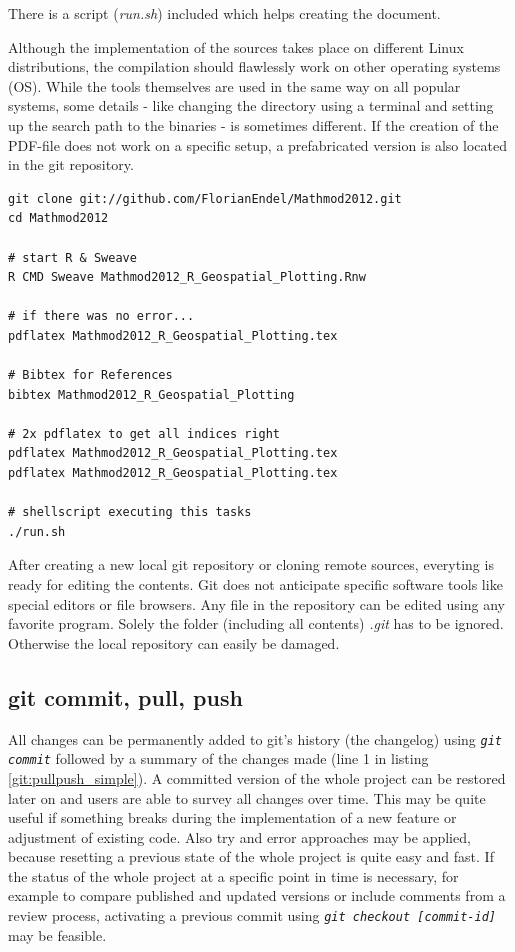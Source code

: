 \documentclass{ifacconf}
\begin{document}
There is a script (\textit{run.sh}) included which helps creating the document.

Although the implementation of the sources takes place on different
Linux distributions, the compilation should flawlessly work on other operating systems (OS).
While the tools themselves are used in the same way on all popular systems, some details
- like changing the directory using a terminal and setting up the search path to the binaries - is sometimes different.
If the creation of the PDF-file does not work on a specific setup, a prefabricated
version is also located in the git repository. 

\begin{lstlisting}
git clone git://github.com/FlorianEndel/Mathmod2012.git
cd Mathmod2012

# start R & Sweave
R CMD Sweave Mathmod2012_R_Geospatial_Plotting.Rnw

# if there was no error...
pdflatex Mathmod2012_R_Geospatial_Plotting.tex

# Bibtex for References
bibtex Mathmod2012_R_Geospatial_Plotting

# 2x pdflatex to get all indices right
pdflatex Mathmod2012_R_Geospatial_Plotting.tex
pdflatex Mathmod2012_R_Geospatial_Plotting.tex

# shellscript executing this tasks
./run.sh
\end{lstlisting}

After creating a new local git repository or cloning remote sources, everyting is ready for
editing the contents. Git does not anticipate specific software tools like special editors or file browsers. Any file in 
the repository can be edited using any favorite program. Solely the folder (including all contents)
\textit{.git} has to be ignored. Otherwise the local repository can easily be damaged.

\subsection{git commit, pull, push}
All changes can be permanently 
added to git's history (the changelog) using \textit{\lstinline!git commit!} followed by a 
summary of the changes made (line 1 in listing \ref{git:pullpush_simple}). 
A committed version of the whole project can be restored later on and users are able to
survey all changes over time. This may be
quite useful if something breaks during the implementation of a new feature or adjustment of existing code.
Also try and error approaches may be applied, because resetting a previous state of the whole project is 
quite easy and fast. If the status of the whole project at a specific point in time is necessary, for example
to compare published and updated versions or include comments from a review process, activating  
a previous commit using \textit{\lstinline!git checkout [commit-id]!} may be feasible.
\end{document}
